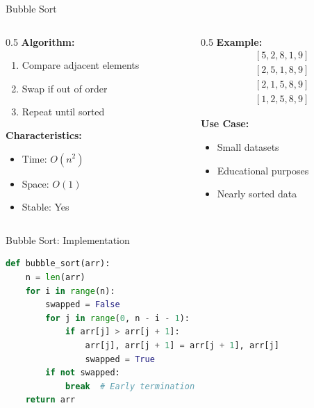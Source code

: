 \documentclass[aspectratio=169,xcolor=dvipsnames]{beamer}
\begin{document}
\begin{frame}{Bubble Sort}
  \begin{columns}
    \begin{column}{0.5\textwidth}
      \textbf{Algorithm:}
      \begin{enumerate}
        \item Compare adjacent elements
        \item Swap if out of order
        \item Repeat until sorted
      \end{enumerate}

      \vspace{0.3cm}
      \textbf{Characteristics:}
      \begin{itemize}
        \item Time: $O(n^2)$
        \item Space: $O(1)$
        \item Stable: Yes
      \end{itemize}
    \end{column}

    \begin{column}{0.5\textwidth}
      \textbf{Example:}
      \begin{align*}
        &[5, 2, 8, 1, 9] \\
        &[2, 5, 1, 8, 9] \\
        &[2, 1, 5, 8, 9] \\
        &[1, 2, 5, 8, 9]
      \end{align*}

      \vspace{0.3cm}
      \textbf{Use Case:}
      \begin{itemize}
        \item Small datasets
        \item Educational purposes
        \item Nearly sorted data
      \end{itemize}
    \end{column}
  \end{columns}
\end{frame}

\begin{frame}[fragile]{Bubble Sort: Implementation}
\begin{lstlisting}[language=Python]
def bubble_sort(arr):
    n = len(arr)
    for i in range(n):
        swapped = False
        for j in range(0, n - i - 1):
            if arr[j] > arr[j + 1]:
                arr[j], arr[j + 1] = arr[j + 1], arr[j]
                swapped = True
        if not swapped:
            break  # Early termination
    return arr
\end{lstlisting}
\end{frame}
\end{document}
